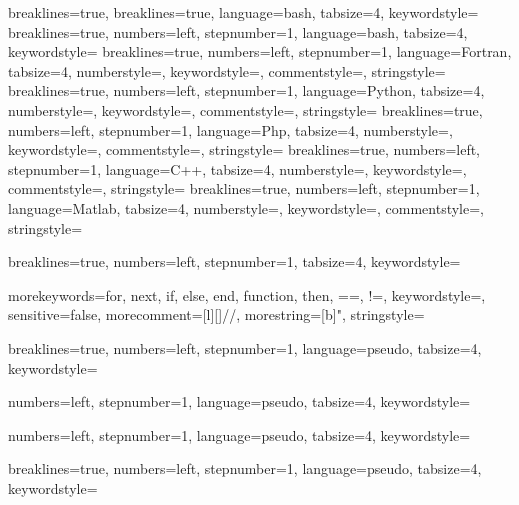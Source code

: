 \usepackage{listings}




{
  breaklines=true,
}
{
  breaklines=true,
  language=bash,
  tabsize=4,
  keywordstyle=\color{red}
}
{
  breaklines=true,
  numbers=left,
  stepnumber=1,
  language=bash,
  tabsize=4,
  keywordstyle=\color{red}
}
{
  breaklines=true,
  numbers=left,
  stepnumber=1,
  language=Fortran,
  tabsize=4,
  numberstyle=\tiny\color{gray},
  keywordstyle=\color{blue},
  commentstyle=\color{dkgreen},
  stringstyle=\color{mauve}
}
{
  breaklines=true,
	numbers=left,
	stepnumber=1,
	language=Python,
	tabsize=4,
	numberstyle=\tiny\color{gray},
	keywordstyle=\color{blue},
	commentstyle=\color{dkgreen},
	stringstyle=\color{mauve}
}
{
  breaklines=true,
	numbers=left,
	stepnumber=1,
	language=Php,
	tabsize=4,
	numberstyle=\tiny\color{gray},
	keywordstyle=\color{blue},
	commentstyle=\color{dkgreen},
	stringstyle=\color{mauve}
}
{
  breaklines=true,
	numbers=left,
	stepnumber=1,
	language=C++,
	tabsize=4,
	numberstyle=\tiny\color{gray},
	keywordstyle=\color{blue},
	commentstyle=\color{dkgreen},
	stringstyle=\color{mauve}
}
{
  breaklines=true,
	numbers=left,
	stepnumber=1,
	language=Matlab,
	tabsize=4,
	numberstyle=\tiny\color{gray},
	keywordstyle=\color{blue},
	commentstyle=\color{dkgreen},
	stringstyle=\color{mauve}
}



{
  breaklines=true,
  numbers=left,
  stepnumber=1,
  tabsize=4,
  keywordstyle=\color{blue}
}




{morekeywords={for, next, if, else, end, function, then, ==, !=},
  keywordstyle=\color{codeblue},
  sensitive=false,
  morecomment=[l][\color{codegreen}]{//},
  morestring=[b]",
  stringstyle=\color{redstrings}
}

{
  breaklines=true,
  numbers=left,
  stepnumber=1,
  language=pseudo,
  tabsize=4,
  keywordstyle=\color{blue}
}


{
}

{
  numbers=left,
  stepnumber=1,
  language=pseudo,
  tabsize=4,
  keywordstyle=\color{black}
}


{
  numbers=left,
  stepnumber=1,
  language=pseudo,
  tabsize=4,
  keywordstyle=\color{black}
}


{
  breaklines=true,
  numbers=left,
  stepnumber=1,
  language=pseudo,
  tabsize=4,
  keywordstyle=\color{black}
}




